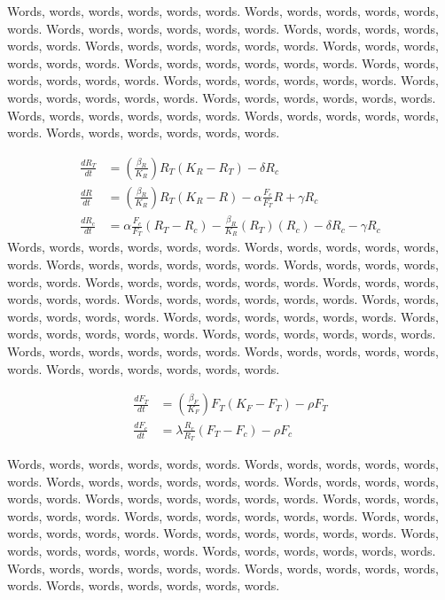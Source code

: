 \documentclass [letterpaper, 12pt] {article}
\begin{document}
Words, words, words, words, words, words. Words, words, words, words, words, words. Words, words, words, words, words, words. Words, words, words, words, words, words. Words, words, words, words, words, words. Words, words, words, words, words, words. Words, words, words, words, words, words. Words, words, words, words, words, words. Words, words, words, words, words, words. Words, words, words, words, words, words. Words, words, words, words, words, words. Words, words, words, words, words, words. Words, words, words, words, words, words. Words, words, words, words, words, words. 

\begin{align}
	\frac{dR_T}{dt} &= (\frac{\beta_R}{K_R})R_T(K_R-R_T)-\delta R_c \\
	\frac{dR}{dt} &= (\frac{\beta_R}{K_R})R_T(K_R-R)-\alpha \frac{F_c}{F_T}R+\gamma  R_c \\
	\frac{dR_c}{dt} &= \alpha \frac{F_c}{F_T} (R_T-R_c)-\frac{\beta_R}{K_R}(R_T)(R_c) - \delta R_c - \gamma R_c 
\end{align}
Words, words, words, words, words, words. Words, words, words, words, words, words. Words, words, words, words, words, words. Words, words, words, words, words, words. Words, words, words, words, words, words. Words, words, words, words, words, words. Words, words, words, words, words, words. Words, words, words, words, words, words. Words, words, words, words, words, words. Words, words, words, words, words, words. Words, words, words, words, words, words. Words, words, words, words, words, words. Words, words, words, words, words, words. Words, words, words, words, words, words. 


\begin{align}
	\frac{dF_T}{dt} &= (\frac{\beta_F}{K_F})F_T(K_F-F_T)-\rho F_T  \\
	\frac{dF_c}{dt} &= \lambda \frac{R_c}{R_T} (F_T-F_c) - \rho F_c 
\end{align}

Words, words, words, words, words, words. Words, words, words, words, words, words. Words, words, words, words, words, words. Words, words, words, words, words, words. Words, words, words, words, words, words. Words, words, words, words, words, words. Words, words, words, words, words, words. Words, words, words, words, words, words. Words, words, words, words, words, words. Words, words, words, words, words, words. Words, words, words, words, words, words. Words, words, words, words, words, words. Words, words, words, words, words, words. Words, words, words, words, words, words. 
\end{document}
